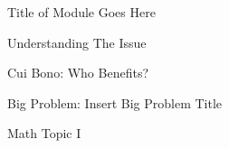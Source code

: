 \documentclass[oneside,10pt]{book}
\begin{document}
\begin{chapter}{Title of Module Goes Here}
\begin{section}{Understanding The Issue}
\label{module-tag-understanding-the-issue}
\end{section}

\begin{section}{Cui Bono: Who Benefits?}
\label{module-tag-cui-bono}
\end{section}

\begin{section}{Big Problem: Insert Big Problem Title}
\label{module-tag-big-problem}
\end{section}

\begin{section}{Math Topic I}
\label{module-tag-math-topic-1}
\end{section}


\end{chapter}
\end{document}
